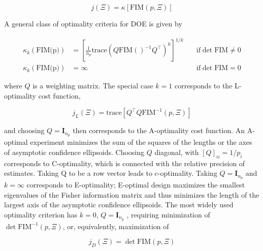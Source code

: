 \documentclass[../Article_Design_of_Experiment.tex]{subfiles}
\begin{document}
	{\footnotesize
	\begin{equation}
		j(\Xi) = \kappa\left[ \text{FIM}(p, \Xi) \right]
	\end{equation} }
	
	
	A general class of optimality criteria for DOE is given by
	
	{\footnotesize
	\begin{align}
		\kappa_k(\text{FIM(p)}) &= \left[\frac{1}{n_p} \text{trace}\left( Q\text{FIM}()^{-1}Q^\top \right)^k \right]^{1/k} \quad &\text{if} \det \text{FIM} \neq 0 \nonumber \\
		\kappa_k(\text{FIM(p)}) &= \infty \quad &\text{if} \det \text{FIM} = 0
	\end{align} }
	
	where $Q$ is a weighting matrix. The special case $k = 1$ corresponds to the L-optimality cost function,
	
	{\footnotesize
	\begin{equation}
		j_L(\Xi) = \text{trace} \left[ Q^\top Q\text{FIM}^{-1}(p,\Xi) \right]
	\end{equation} }
	
	and choosing $Q = \textbf{I}_{n_p}$ then corresponds to the A-optimality cost function. An A-optimal experiment minimizes the sum of the squares of the lengths or the axes of asymptotic confidence ellipsoids. Choosing $Q$ diagonal, with $[Q]_{ii} = 1/p_i$ corresponds to C-optimality, which is connected with the relative precision of estimates. Taking Q to be a row vector leads to c-optimality. Taking $Q = \textbf{I}_{n_p}$ and $k = \infty$ corresponds to E-optimality; E-optimal design maximizes the smallest eigenvalues of the Fisher information matrix and thus minimizes the length of the largest axis of the asymptotic confidence ellipsoids. The most widely used optimality criterion has $k = 0$, $Q = \textbf{I}_{n_p}$ , requiring minimization of $\det \text{FIM}^{-1}(p, \Xi)$, or, equivalently, maximization of
	
	{\footnotesize
	\begin{equation}
		j_D(\Xi) = \det \text{FIM}(p, \Xi)
	\end{equation} }
	
\end{document}
